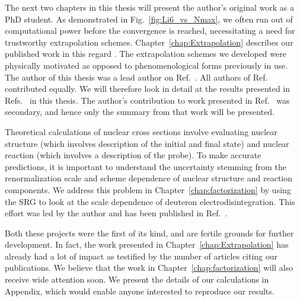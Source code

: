 	The next two chapters in this thesis will present the author's
	original work as a PhD student.
	As demonstrated in Fig.~\ref{fig:Li6_vs_Nmax}, we often run out of
	computational power before the convergence is reached, necessitating a need
	for trustworthy extrapolation schemes.
	Chapter~\ref{chap:Extrapolation} describes our published work in this
	regard \cite{More:2013rma,Furnstahl:2013vda,Konig:2014hma}.
	The extrapolation schemes we developed were physically motivated as opposed
	to phenomenological forms previously in use.
	The author of this thesis was a lead author on Ref.~\cite{More:2013rma}.
	All authors of Ref.~\cite{Furnstahl:2013vda} contributed equally.
	We will therefore look in detail at the results presented in
	Refs.~\cite{More:2013rma, Furnstahl:2013vda} in this thesis.
	The author's contribution to work presented in Ref.~\cite{Konig:2014hma}
	was secondary, and hence only the summary from that work will be
	presented.

	Theoretical calculations of nuclear cross sections involve evaluating
	nuclear structure (which involves description of the initial and final state)
	and	nuclear reaction (which involves a description of the probe).  To make
	accurate predictions, it is important to understand the uncertainty
	stemming from the renormalization scale and scheme dependence of
	nuclear structure and reaction components.  We address this problem in
	Chapter~\ref{chap:factorization} by using the SRG to look at the scale
	dependence of deuteron electrodisintegration.  This effort was led by the
	author and has been published in Ref.~\cite{More:2015tpa}.

	Both these projects were the first of its kind, and are fertile grounds for
	further	development.  In fact, the work presented in
	Chapter~\ref{chap:Extrapolation} has already had a lot of impact as testified
	by the number of articles citing our publications.  We believe that the
	work in Chapter~\ref{chap:factorization} will also receive wide
	attention soon.  We present the details of our calculations in Appendix, which
	would enable anyone interested to reproduce our results.
